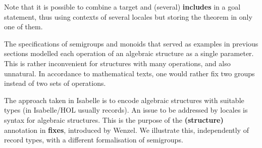 \begin{isabellebody}
\begin{isamarkuptext}
\[\]
  Note that it is possible to
  combine a target and (several) \textbf{includes} in a goal statement, thus
  using contexts of several locales but storing the theorem in only
  one of them.%
\end{isamarkuptext}%
\isamarkuptrue%
%
\isamarkuptrue%
%
\begin{isamarkuptext}%
\label{sec-structures}
  The specifications of semigroups and monoids that served as examples
  in previous sections modelled each operation of an algebraic
  structure as a single parameter.  This is rather inconvenient for
  structures with many operations, and also unnatural.  In accordance
  to mathematical texts, one would rather fix two groups instead of
  two sets of operations.

  The approach taken in Isabelle is to encode algebraic structures
  with suitable types (in Isabelle/HOL usually records).  An issue to
  be addressed by
  locales is syntax for algebraic structures.  This is the purpose of
  the \textbf{(structure)} annotation in \textbf{fixes}, introduced by
  Wenzel.  We illustrate this, independently of record types, with a
  different formalisation of semigroups.


\end{isamarkuptext}
\end{isabellebody}
